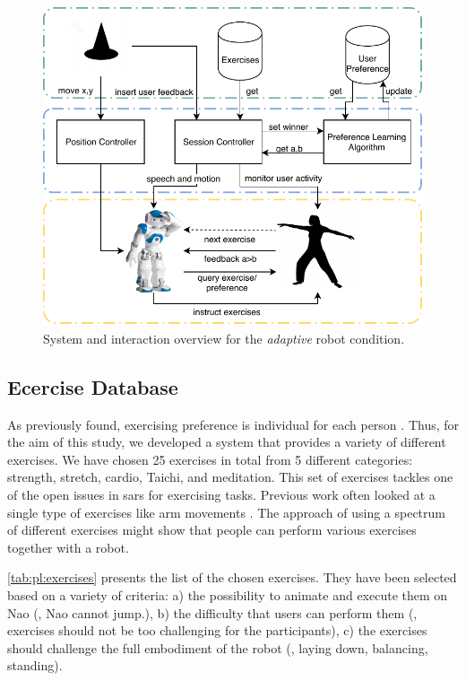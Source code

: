 \documentclass[twocolumn]{svjour3}          %
\begin{document}
\begin{figure}[h!]
\includegraphics[width=\columnwidth]{figures/figure-latex/systeminteraction.pdf}
\caption{System and interaction overview for the \textit{adaptive} robot condition.} \label{fig:system}
\end{figure}

\hypertarget{ecercise-database}{%
\subsection{Ecercise Database}\label{ecercise-database}}

As previously found, exercising preference is individual for each person
\autocite{rhodes2006personality}. Thus, for the aim of this study, we
developed a system that provides a variety of different exercises. We
have chosen 25 exercises in total from 5 different categories: strength,
stretch, cardio, Taichi, and meditation. This set of exercises tackles
one of the open issues in \glspl{sar} for exercising tasks. Previous work often
looked at a single type of exercises like arm movements
\autocite{eriksson2005hands,fasola2013socially,guneysu2017}. The
approach of using a spectrum of different exercises might show that
people can perform various exercises together with a robot.

\ref{tab:pl:exercises} presents the list of the chosen exercises. They
have been selected based on a variety of criteria: a) the possibility to
animate and execute them on Nao (\ie{}, Nao cannot jump.), b) the
difficulty that users can perform them (\ie{}, exercises should not be
too challenging for the participants), c) the exercises should challenge
the full embodiment of the robot (\ie{}, laying down, balancing,
standing).
\end{document}
